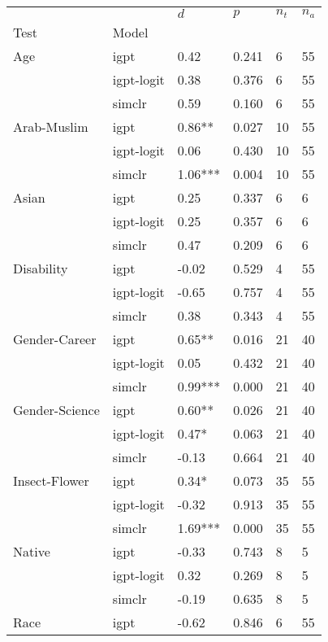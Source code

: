 \begin{tabular}{llllll}
\toprule
       &        &      $d$ &    $p$ & $n_t$ & $n_a$ \\
Test & Model &          &        &       &       \\
\midrule
Age & igpt &     0.42 &  0.241 &     6 &    55 \\
       & igpt-logit &     0.38 &  0.376 &     6 &    55 \\
       & simclr &     0.59 &  0.160 &     6 &    55 \\
Arab-Muslim & igpt &   0.86** &  0.027 &    10 &    55 \\
       & igpt-logit &     0.06 &  0.430 &    10 &    55 \\
       & simclr &  1.06*** &  0.004 &    10 &    55 \\
Asian & igpt &     0.25 &  0.337 &     6 &     6 \\
       & igpt-logit &     0.25 &  0.357 &     6 &     6 \\
       & simclr &     0.47 &  0.209 &     6 &     6 \\
Disability & igpt &    -0.02 &  0.529 &     4 &    55 \\
       & igpt-logit &    -0.65 &  0.757 &     4 &    55 \\
       & simclr &     0.38 &  0.343 &     4 &    55 \\
Gender-Career & igpt &   0.65** &  0.016 &    21 &    40 \\
       & igpt-logit &     0.05 &  0.432 &    21 &    40 \\
       & simclr &  0.99*** &  0.000 &    21 &    40 \\
Gender-Science & igpt &   0.60** &  0.026 &    21 &    40 \\
       & igpt-logit &    0.47* &  0.063 &    21 &    40 \\
       & simclr &    -0.13 &  0.664 &    21 &    40 \\
Insect-Flower & igpt &    0.34* &  0.073 &    35 &    55 \\
       & igpt-logit &    -0.32 &  0.913 &    35 &    55 \\
       & simclr &  1.69*** &  0.000 &    35 &    55 \\
Native & igpt &    -0.33 &  0.743 &     8 &     5 \\
       & igpt-logit &     0.32 &  0.269 &     8 &     5 \\
       & simclr &    -0.19 &  0.635 &     8 &     5 \\
Race & igpt &    -0.62 &  0.846 &     6 &    55 \\

\end{tabular}
